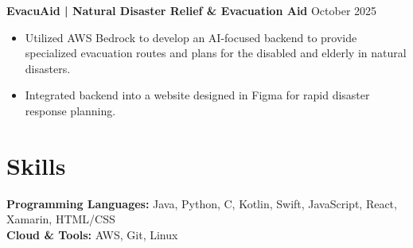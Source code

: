 \documentclass[11pt]{article}
\begin{document}
\textbf{EvacuAid | Natural Disaster Relief \& Evacuation Aid} \hfill October 2025
\begin{itemize}
    \item Utilized AWS Bedrock to develop an AI-focused backend to provide specialized evacuation routes and plans for the disabled and elderly in natural disasters.
    \item Integrated backend into a website designed in Figma for rapid disaster response planning.
\end{itemize}

\vspace{0.15in}

\section*{Skills}

\textbf{Programming Languages:} Java, Python, C, Kotlin, Swift, JavaScript, React, Xamarin, HTML/CSS \\
\textbf{Cloud \& Tools:} AWS, Git, Linux
\end{document}
